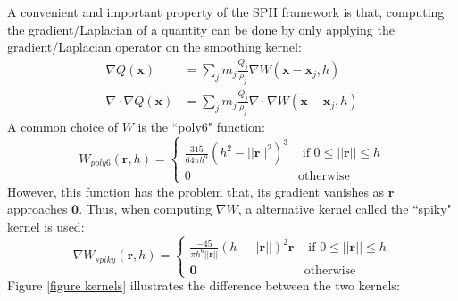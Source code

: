 A convenient and important property of the SPH framework is that, computing the gradient/Laplacian of a quantity can be done by only applying the gradient/Laplacian operator on the smoothing kernel:
\begin{equation}
    \label{eqn SPH derivative}
    \begin{aligned}
        \nabla Q(\textbf{x}) &= \sum_{j} m_j \frac{Q_j}{\rho_j} \nabla W(\textbf{x}-\textbf{x}_j,h) \\
        \nabla \cdot \nabla Q(\textbf{x}) &= \sum_{j} m_j \frac{Q_j}{\rho_j} \nabla \cdot \nabla W(\textbf{x}-\textbf{x}_j,h)
    \end{aligned}
\end{equation}
A common choice of $W$ is the ``poly6" function:
$$
    W_{poly6}(\textbf{r},h)=
        \begin{cases}
            \frac{315}{64\pi h^9}(h^2-||\textbf{r}||^2)^3 &\mbox{ if } 0\leq||\textbf{r}||\leq h\\
            0 &\mbox{otherwise} 
        \end{cases}
$$
However, this function has the problem that, its gradient vanishes as $\textbf{r}$ approaches $\textbf{0}$. Thus, when computing $\nabla W$, a alternative kernel called the ``spiky" kernel is used:
$$
    \nabla W_{spiky}(\textbf{r},h)=
        \begin{cases}
            \frac{-45}{\pi h^6||\textbf{r}||}(h-||\textbf{r}||)^2\textbf{r} &\mbox{ if } 0\leq||\textbf{r}||\leq h\\
            \textbf{0} &\mbox{otherwise} 
        \end{cases}
$$
Figure \ref{figure kernels} illustrates the difference between the two kernels:

